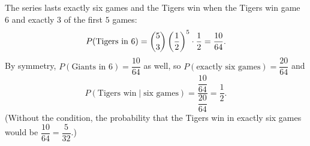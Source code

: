 The series lasts exactly six games and the Tigers win when the Tigers win game $6$ and exactly $3$ of the first $5$ games:
\[
P(\text{Tigers in }6)=\dbinom53\left(\dfrac{1}{2}\right)^5\cdot\dfrac{1}{2}=\dfrac{10}{64}.
\]
By symmetry, $P(\text{Giants in }6)=\dfrac{10}{64}$ as well, so $P(\text{exactly six games})=\dfrac{20}{64}$ and
\[
P(\text{Tigers win}\mid\text{six games})=\dfrac{\dfrac{10}{64}}{\dfrac{20}{64}}=\boxed{\dfrac{1}{2}}.
\]
(Without the condition, the probability that the Tigers win in exactly six games would be $\dfrac{10}{64}=\dfrac{5}{32}$.)
